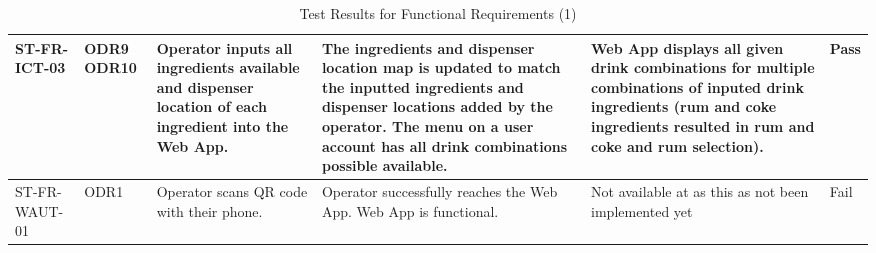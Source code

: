 \documentclass[12pt, titlepage]{article}
\begin{document}
\begin{rotate}{}
\begin{landscape}
\begin{table}
\begin{tabular}{|p{2.75cm}|p{2.5cm}|p{4cm}|p{4.75cm}|p{4.25cm}|p{1.5cm}|}
            \hline
            ST-FR-ICT-03 & ODR9 \newline ODR10 & Operator inputs all ingredients available and dispenser location of each ingredient into the Web App. & The ingredients and dispenser location map is updated to match the inputted ingredients and dispenser locations added by the operator. The menu on a user account has all drink combinations possible available. & Web App displays all given drink combinations for multiple combinations of inputed drink ingredients (rum and coke ingredients resulted in rum and coke and rum selection). & Pass \\
            \hline
            ST-FR-WAUT-01 & ODR1 & Operator scans QR code with their phone. & Operator successfully reaches the Web App. Web App is functional. & Not available at as this as not been implemented yet & Fail \\
            \hline
            
            \end{tabular}
            \caption{Test Results for Functional Requirements (1)}
            \label{tab: caption}
        \end{table}
     \end{landscape}
    \end{rotate}
\end{document}

